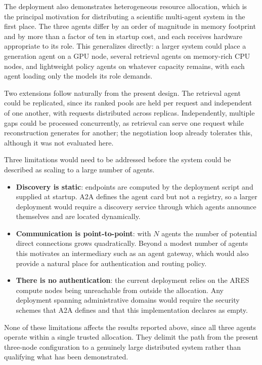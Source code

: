 The deployment also demonstrates heterogeneous resource allocation, which is the principal
motivation for distributing a scientific multi-agent system in the first place. The three
agents differ by an order of magnitude in memory footprint and by more than a factor of ten
in startup cost, and each receives hardware appropriate to its role. This generalizes
directly: a larger system could place a generation agent on a GPU node, several retrieval
agents on memory-rich CPU nodes, and lightweight policy agents on whatever capacity remains,
with each agent loading only the models its role demands.

Two extensions follow naturally from the present design. The retrieval agent could be
replicated, since its ranked pools are held per request and independent of one another, with
requests distributed across replicas. Independently, multiple gaps could be processed
concurrently, as retrieval can serve one request while reconstruction generates for another;
the negotiation loop already tolerates this, although it was not evaluated here.

Three limitations would need to be addressed before the system could be described as
scaling to a large number of agents.

\begin{itemize}
    \item \textbf{Discovery is static}: endpoints are computed by the deployment script and
    supplied at startup. A2A defines the agent card but not a registry, so a larger
    deployment would require a discovery service through which agents announce themselves
    and are located dynamically.

    \item \textbf{Communication is point-to-point}: with $N$ agents the number of potential
    direct connections grows quadratically. Beyond a modest number of agents this motivates
    an intermediary such as an agent gateway, which would also provide a natural place for
    authentication and routing policy.

    \item \textbf{There is no authentication}: the current deployment relies on the ARES
    compute nodes being unreachable from outside the allocation. Any deployment spanning
    administrative domains would require the security schemes that A2A defines and that this
    implementation declares as empty.
\end{itemize}

None of these limitations affects the results reported above, since all three agents operate
within a single trusted allocation. They delimit the path from the present three-node
configuration to a genuinely large distributed system rather than qualifying what has been
demonstrated.

